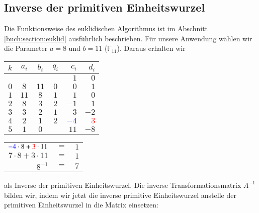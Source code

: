 \subsection{Inverse der primitiven Einheitswurzel
\label{reedsolomon:subsection:invEinh}}

Die Funktionsweise des euklidischen Algorithmus ist im Abschnitt \ref{buch:section:euklid} ausführlich beschrieben.
Für unsere Anwendung wählen wir die Parameter $a = 8$ und $b = 11$ ($\mathbb{F}_{11}$).
Daraus erhalten wir 

\begin{center}

\begin{tabular}{| c | c c | c | r r |}
	\hline
	$k$ & $a_i$ & $b_i$ & $q_i$ & $c_i$ & $d_i$\\
	\hline 
	& & & & $1$& $0$\\
	$0$& $8$& $11$& $0$& $0$& $1$\\
	$1$& $11$& $8$& $1$& $1$& $0$\\
	$2$& $8$& $3$& $2$& $-1$& $1$\\
	$3$& $3$& $2$& $1$& $3$& $-2$\\
	$4$& $2$& $1$& $2$& \textcolor{blue}{$-4$}& \textcolor{red}{$3$}\\
	$5$& $1$& $0$& & $11$& $-8$\\
	\hline
\end{tabular}

\end{center}
\begin{center}

\begin{tabular}{rcl}
	$\textcolor{blue}{-4} \cdot 8 + \textcolor{red}{3} \cdot 11$ &$=$& $1$\\
	$7 \cdot 8 + 3 \cdot 11$ &$=$& $1$\\
	$8^{-1}$ &$=$& $7$
	
\end{tabular}

\end{center}
als Inverse der primitiven Einheitswurzel. Die inverse Transformationsmatrix $A^{-1}$ bilden wir, indem wir jetzt die inverse primitive Einheitswurzel anstelle der primitiven Einheitswurzel in die Matrix einsetzen:
